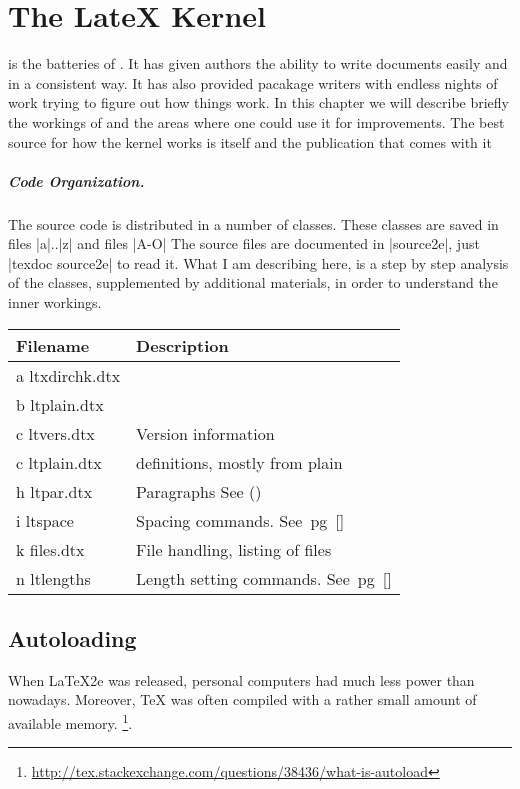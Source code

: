 \makeatletter
{}
\renewsection

\chapter{The LateX Kernel}


\latex is the batteries of \tex. It has given authors the ability to write documents easily and in a consistent way. It has also provided pacakage writers with endless nights of work trying to figure out how things work. In this chapter we will describe briefly the workings of \latex and the areas where one could use it for improvements. The best source for how the \latex kernel works is \latex itself and the publication that comes with it 

\paragraph{Code Organization.} The \latex source code is distributed in a number of classes. These classes are saved in files |a|..|z| and files |A-O| The source files are documented in |source2e|, just |texdoc source2e| to read it. What I am describing here, is a step by step analysis of the classes, supplemented by additional materials, in order to understand the inner workings. 

{\RaggedRight
\begin{tabular}{lp{5cm}}
\toprule
Filename  &Description \\
\midrule
a ltxdirchk.dtx &        \\
b ltplain.dtx    &        \\
c ltvers.dtx     & Version information       \\
c ltplain.dtx    & definitions, mostly from plain\\
h ltpar.dtx      & Paragraphs See (\pageref{pars})\\
i  ltspace        &Spacing commands. See~pg~[\pageref{spc}]\\
k files.dtx       & File handling, listing of files\\
n ltlengths      & Length setting commands. See~pg~[\pageref{kernel:lengths}]\\
\bottomrule
\end{tabular}
}

\section{Autoloading}
When LaTeX2e was released, personal computers had much less power than nowadays. Moreover, TeX was often compiled with a rather small amount of available memory.
\footnote{\url{http://tex.stackexchange.com/questions/38436/what-is-autoload}}.

